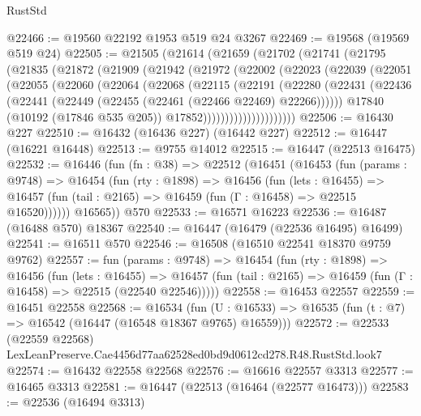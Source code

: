 \begin{lexlean}{RustStd}
\begin{coremodule}
@22466 := @19560 @22192 @1953 @519 @24 @3267
@22469 := @19568 (@19569 @519 @24)
@22505 := @21505
    (@21614
      (@21659
        (@21702
          (@21741
            (@21795
              (@21835
                (@21872
                  (@21909
                    (@21942
                      (@21972
                        (@22002
                          (@22023
                            (@22039
                              (@22051
                                (@22055
                                  (@22060
                                    (@22064
                                      (@22068
                                        (@22115
                                          (@22191
                                            (@22280
                                              (@22431
                                                (@22436
                                                  (@22441
                                                    (@22449
                                                      (@22455 (@22461 (@22466 @22469) @22266))))))
                                              @17840
                                              (@10192 (@17846 @535 @205))
                                              @17852)))))))))))))))))))))
@22506 := @16430 @227
@22510 := @16432 (@16436 @227) (@16442 @227)
@22512 := @16447 (@16221 @16448)
@22513 := @9755 @14012
@22515 := @16447 (@22513 @16475)
@22532 := @16446
    (fun (fn : @38) =>
    @22512
      (@16451
        (@16453
          (fun (params : @9748) =>
          @16454
            (fun (rty : @1898) =>
            @16456
              (fun (lets : @16455) =>
              @16457 (fun (tail : @2165) => @16459 (fun (Γ : @16458) => @22515 @16520))))))
        @16565))
    @570
@22533 := @16571 @16223
@22536 := @16487 (@16488 @570) @18367
@22540 := @16447 (@16479 (@22536 @16495) @16499)
@22541 := @16511 @570
@22546 := @16508 (@16510 @22541 @18370 @9759 @9762)
@22557 := fun (params : @9748) =>
  @16454
    (fun (rty : @1898) =>
    @16456
      (fun (lets : @16455) =>
      @16457 (fun (tail : @2165) => @16459 (fun (Γ : @16458) => @22515 (@22540 @22546)))))
@22558 := @16453 @22557
@22559 := @16451 @22558
@22568 := @16534
    (fun (U : @16533) => @16535 (fun (t : @7) => @16542 (@16447 (@16548 @18367 @9765) @16559)))
@22572 := @22533 (@22559 @22568) LexLeanPreserve.Cae4456d77aa62528ed0bd9d0612cd278.R48.RustStd.look7
@22574 := @16432 @22558 @22568
@22576 := @16616 @22557 @3313
@22577 := @16465 @3313
@22581 := @16447 (@22513 (@16464 (@22577 @16473)))
@22583 := @22536 (@16494 @3313)

\end{coremodule}
\end{lexlean}
